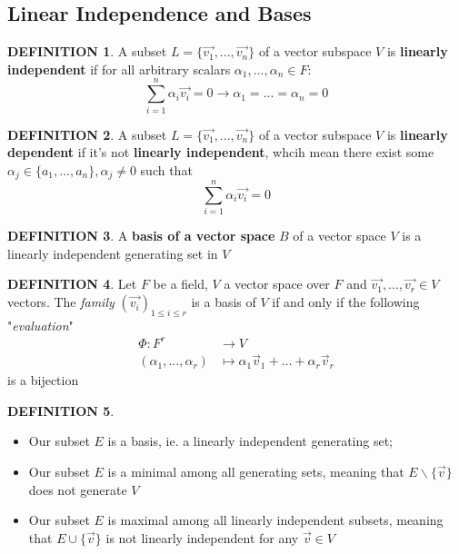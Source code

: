 \documentclass[12pt]{article}
\theoremstyle{definition}
\newtheorem{definition}{DEFINITION}[subsection]
\begin{document}
\subsection{Linear Independence and Bases}
\begin{definition}
    A subset $L = \{\overrightarrow{v_1},...,\overrightarrow{v_n}\}$ of a vector subspace $V$ is \textbf{linearly independent} if for all arbitrary scalars $\alpha_1, ..., \alpha_n \in F$:
    $$\sum_{i=1}^n{\alpha_i\overrightarrow{v_i}} = 0 \rightarrow \alpha_1 = ... = \alpha_n = 0$$
\end{definition}
\begin{definition}
    A subset $L = \{\overrightarrow{v_1},...,\overrightarrow{v_n}\}$ of a vector subspace $V$ is \textbf{linearly dependent} if it's not \textbf{linearly independent}, whcih mean there exist some $\alpha_j \in \{a_1, ..., a_n\}, \alpha_j \neq 0$ such that  $$\sum_{i=1}^n{\alpha_i\overrightarrow{v_i}} = 0$$
\end{definition}
\begin{definition}
    A \textbf{basis of a vector space} $B$ of a vector space $V$ is a linearly independent generating set in $V$
\end{definition}
\begin{definition}
    Let $F$ be a field, $V$ a vector space over $F$ and $\overrightarrow{v_1},...,\overrightarrow{v_r} \in V$ vectors. The \textit{family} $(\overrightarrow{v_i})_{1\leq i\leq r}$ is a basis of $V$ if and only if the following "\textit{evaluation}"
    \[
        \begin{split}
            \Phi : F^r &\rightarrow V\\
            (\alpha_1,...,\alpha_r) &\mapsto \alpha_1\overrightarrow{v}_1 + ... + \alpha_r\overrightarrow{v}_r
        \end{split}
    \]
    is a bijection
\end{definition}
\begin{definition}
    \begin{itemize}
    The following for a subset $E$ of a vector space $V$ are equivalent:An isomorphism of a vector space to itself is called \textbf{anautomorphism} of our vector space.
        \item Our subset $E$ is a basis, ie. a linearly independent generating set;
        \item Our subset $E$ is a minimal among all generating sets, meaning that $E\backslash\{\overrightarrow{v}\}$ does not generate $V$
        \item Our subset $E$ is maximal among all linearly independent subsets, meaning that $E\cup\{\overrightarrow{v}\}$ is not linearly independent for any $\overrightarrow{v} \in V$
    \end{itemize}
\end{definition}
\end{document}
